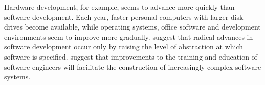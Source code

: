 Hardware development, for example, seems to advance more quickly than software development. Each year, faster personal computers with larger disk drives become available, while operating systems, office software and development environments seem to improve more gradually. \cite{brooks86nosilverbullet,selic03pragmatics,kleppe03mda} suggest that radical advances in software development occur only by raising the level of abstraction at which software is specified. \cite{rae04challenges} suggest that improvements to the training and education of software engineers will facilitate the construction of increasingly complex software systems.



%  

% 
% 
% 
% 











